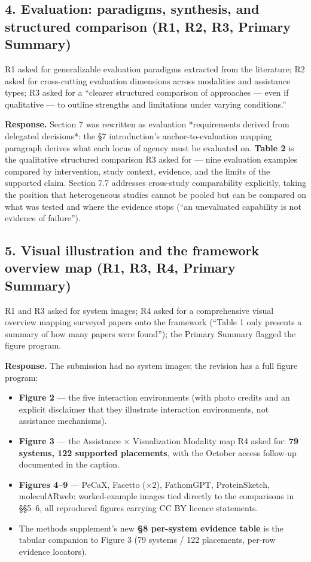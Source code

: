 \documentclass[11pt]{article}
\begin{document}
\subsection*{4. Evaluation: paradigms, synthesis, and structured comparison (R1, R2, R3, Primary Summary)}

R1 asked for generalizable evaluation paradigms extracted from the literature; R2 asked for cross-cutting evaluation dimensions across modalities and assistance types; R3 asked for a ``clearer structured comparison of approaches — even if qualitative — to outline strengths and limitations under varying conditions.''

\textbf{Response.} Section 7 was rewritten as evaluation *requirements derived from delegated decisions*: the \S7 introduction's anchor-to-evaluation mapping paragraph derives what each locus of agency must be evaluated on. \textbf{Table 2} is the qualitative structured comparison R3 asked for — nine evaluation examples compared by intervention, study context, evidence, and the limits of the supported claim. Section 7.7 addresses cross-study comparability explicitly, taking the position that heterogeneous studies cannot be pooled but can be compared on what was tested and where the evidence stops (``an unevaluated capability is not evidence of failure'').

\subsection*{5. Visual illustration and the framework overview map (R1, R3, R4, Primary Summary)}

R1 and R3 asked for system images; R4 asked for a comprehensive visual overview mapping surveyed papers onto the framework (``Table 1 only presents a summary of how many papers were found''); the Primary Summary flagged the figure program.

\textbf{Response.} The submission had no system images; the revision has a full figure program:
\begin{itemize}[leftmargin=*]
\item \textbf{Figure 2} — the five interaction environments (with photo credits and an explicit disclaimer that they illustrate interaction environments, not assistance mechanisms).
\item \textbf{Figure 3} — the Assistance $\times$ Visualization Modality map R4 asked for: \textbf{79 systems, 122 supported placements}, with the October access follow-up documented in the caption.
\item \textbf{Figures 4--9} — PeCaX, Facetto ($\times$2), FathomGPT, ProteinSketch, moleculARweb: worked-example images tied directly to the comparisons in \S\S5--6, all reproduced figures carrying CC BY licence statements.
\item The methods supplement's new \textbf{\S8 per-system evidence table} is the tabular companion to Figure 3 (79 systems / 122 placements, per-row evidence locators).
\end{itemize}
\end{document}
